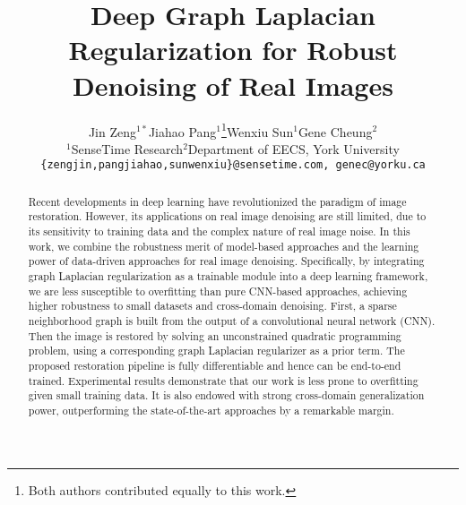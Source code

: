 \documentclass[10pt,twocolumn,letterpaper]{article}
\begin{document}
\title{Deep Graph Laplacian Regularization for Robust Denoising of Real Images}

\author{Jin Zeng$^{1*}$\hspace{35pt}Jiahao Pang$^1$\thanks{Both authors contributed equally to this work.}\hspace{35pt}Wenxiu Sun$^1$\hspace{35pt}Gene Cheung$^2$\\
$^1$SenseTime Research\hspace{30pt}$^2$Department of EECS, York University\\
{\tt\small \{zengjin,\hspace{3pt}pangjiahao,\hspace{3pt}sunwenxiu\}@sensetime.com, genec@yorku.ca}
}

\maketitle

\begin{abstract}
Recent developments in deep learning have revolutionized the paradigm of image restoration. 
However, its applications on real image denoising are still limited, due to its sensitivity to training data and the complex nature of real image noise.
In this work, we combine the robustness merit of model-based approaches and the learning power of data-driven approaches for real image denoising.
Specifically, by integrating graph Laplacian regularization as a trainable module into a deep learning framework, we are less susceptible to overfitting than pure CNN-based approaches, achieving higher robustness to small datasets and cross-domain denoising.
First, a sparse neighborhood graph is built from the output of a convolutional neural network (CNN). 
Then the image is restored by solving an unconstrained quadratic programming problem, using a corresponding graph Laplacian regularizer as a prior term. 
The proposed restoration pipeline is fully differentiable and hence can be end-to-end trained. 
Experimental results demonstrate that our work is less prone to overfitting given small training data. 
It is also endowed with strong cross-domain generalization power, outperforming the state-of-the-art approaches by a remarkable margin.
\end{abstract}

\vspace{-10pt}
\end{document}
